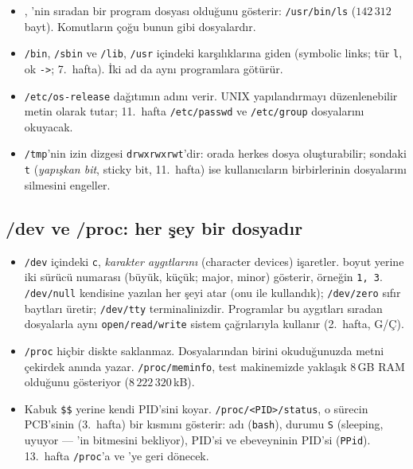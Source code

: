 \begin{itemize}
  \item {}, 'nin sıradan bir program dosyası olduğunu gösterir: \texttt{/usr/bin/ls} ($142\,312$ bayt). Komutların çoğu bunun gibi dosyalardır.
  \item \texttt{/bin}, \texttt{/sbin} ve \texttt{/lib}, \texttt{/usr} içindeki karşılıklarına giden  (symbolic links; tür \texttt{l}, ok \texttt{->}; 7.\ hafta). İki ad da aynı programlara götürür.
  \item \texttt{/etc/os-release} dağıtımın adını verir. UNIX yapılandırmayı düzenlenebilir metin olarak tutar; 11.\ hafta \texttt{/etc/passwd} ve \texttt{/etc/group} dosyalarını okuyacak.
  \item \texttt{/tmp}'nin izin dizgesi \texttt{drwxrwxrwt}'dir: orada herkes dosya oluşturabilir; sondaki \texttt{t} (\emph{yapışkan bit}, sticky bit, 11.\ hafta) ise kullanıcıların birbirlerinin dosyalarını silmesini engeller.
\end{itemize}

\subsection{/dev ve /proc: her şey bir dosyadır}


\begin{itemize}
  \item \texttt{/dev} içindeki \texttt{c}, \emph{karakter aygıtlarını} (character devices) işaretler.  boyut yerine iki sürücü numarası (büyük, küçük; major, minor) gösterir, örneğin \texttt{1, 3}. \texttt{/dev/null} kendisine yazılan her şeyi atar (onu  ile kullandık); \texttt{/dev/zero} sıfır baytları üretir; \texttt{/dev/tty} terminalinizdir. Programlar bu aygıtları sıradan dosyalarla aynı \texttt{open/read/write} sistem çağrılarıyla kullanır (2.\ hafta, G/Ç).
  \item \texttt{/proc} hiçbir diskte saklanmaz. Dosyalarından birini okuduğunuzda metni çekirdek anında yazar. \texttt{/proc/meminfo}, test makinemizde yaklaşık $8$\,GB RAM olduğunu gösteriyor ($8\,222\,320$\,kB).
  \item Kabuk \texttt{\$\$} yerine kendi PID'sini koyar. \texttt{/proc/<PID>/status}, o sürecin PCB'sinin (3.\ hafta) bir kısmını gösterir: adı (\texttt{bash}), durumu \texttt{S} (sleeping, uyuyor --- 'in bitmesini bekliyor), PID'si ve ebeveyninin PID'si (\texttt{PPid}). 13.\ hafta \texttt{/proc}'a ve 'ye geri dönecek.
\end{itemize}

